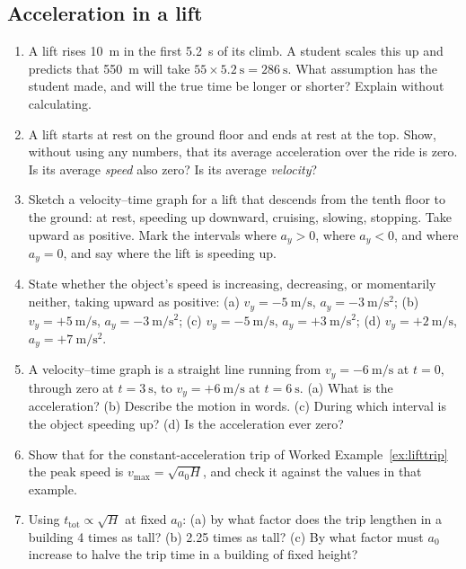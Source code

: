 \documentclass[11pt,twoside,openany]{book}
\newcounter{check}[chapter]
\begin{document}
\subsection*{Acceleration in a lift}
\begin{enumerate}[label=\textbf{\thechapter.\arabic*},resume=exercises,leftmargin=*]
  \item A lift rises \SI{10}{\metre} in the first \SI{5.2}{\second} of its climb. A student scales this up and predicts that \SI{550}{\metre} will take $55 \times \SI{5.2}{\second} = \SI{286}{\second}$. What assumption has the student made, and will the true time be longer or shorter? Explain without calculating.
  \item A lift starts at rest on the ground floor and ends at rest at the top. Show, without using any numbers, that its average acceleration over the ride is zero. Is its average \emph{speed} also zero? Is its average \emph{velocity}?
  \item Sketch a velocity--time graph for a lift that descends from the tenth floor to the ground: at rest, speeding up downward, cruising, slowing, stopping. Take upward as positive. Mark the intervals where $a_y > 0$, where $a_y < 0$, and where $a_y = 0$, and say where the lift is speeding up.
  \item State whether the object's speed is increasing, decreasing, or momentarily neither, taking upward as positive: (a) $v_y = \SI{-5}{\metre\per\second}$, $a_y = \SI{-3}{\metre\per\second\squared}$; (b) $v_y = +\SI{5}{\metre\per\second}$, $a_y = \SI{-3}{\metre\per\second\squared}$; (c) $v_y = \SI{-5}{\metre\per\second}$, $a_y = +\SI{3}{\metre\per\second\squared}$; (d) $v_y = +\SI{2}{\metre\per\second}$, $a_y = +\SI{7}{\metre\per\second\squared}$.
  \item A velocity--time graph is a straight line running from $v_y = \SI{-6}{\metre\per\second}$ at $t = 0$, through zero at $t = \SI{3}{\second}$, to $v_y = +\SI{6}{\metre\per\second}$ at $t = \SI{6}{\second}$. (a) What is the acceleration? (b) Describe the motion in words. (c) During which interval is the object speeding up? (d) Is the acceleration ever zero?
  \item Show that for the constant-acceleration trip of Worked Example~\ref{ex:lifttrip} the peak speed is $v_{\max} = \sqrt{a_0 H}$, and check it against the values in that example.
  \item Using $t_{\text{tot}} \propto \sqrt{H}$ at fixed $a_0$: (a) by what factor does the trip lengthen in a building \num{4} times as tall? (b) \num{2.25} times as tall? (c) By what factor must $a_0$ increase to halve the trip time in a building of fixed height?

\end{enumerate}
\end{document}
